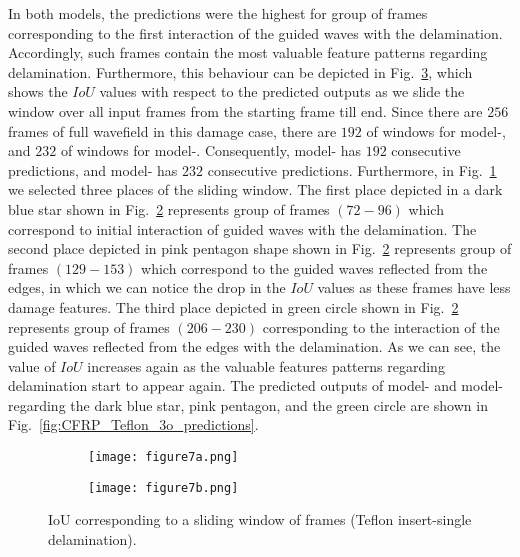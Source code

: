 
In both models, the predictions were the highest for group of frames corresponding to the first interaction of the guided waves with the delamination.
Accordingly, such frames contain the most valuable feature patterns regarding delamination. 
Furthermore, this behaviour can be depicted in Fig.~\ref{fig:CFRP_Teflon_3o_IoU_centre_window}, which shows the \(IoU\) values with respect to the predicted outputs as we slide the window over all input frames from the starting frame till end.
Since there are \(256\) frames of full wavefield in this damage case, there are \(192\) of windows for model-, and \(232\) of windows for model-.
Consequently, model- has \(192\) consecutive predictions, and model- has \(232\) consecutive predictions.
Furthermore, in Fig.~\ref{fig:CFRP_Teflon_3o_IoU_} we selected three places of the sliding window. 
The first place depicted in a dark blue star shown in Fig.~\ref{fig:CFRP_teflon_3o_shapes_} represents group of frames \((72-96)\) which correspond to initial interaction of guided waves with the delamination.
The second place depicted in pink pentagon shape shown in Fig.~\ref{fig:CFRP_teflon_3o_shapes_} represents group of frames \((129-153)\) which correspond to the guided waves reflected from the edges, in which we can notice the drop in the \(IoU\) values as these frames have less damage features.
The third place depicted in green circle shown in Fig.~\ref{fig:CFRP_teflon_3o_shapes_} represents group of frames \((206-230)\) corresponding to the interaction of the guided waves reflected from the edges with the delamination.
As we can see, the value of \(IoU\) increases again as the valuable features patterns regarding delamination start to appear again.
The predicted outputs of model- and model- regarding the dark blue star, pink pentagon, and the green circle are shown in Fig.~\ref{fig:CFRP_Teflon_3o_predictions}.
\begin{figure} [!h]
	\begin{subfigure}[b]{1\textwidth}
		\centering
		\texttt{[image: figure7a.png]}
		\caption{}
		\label{fig:CFRP_Teflon_3o_IoU_}
	\end{subfigure}
	\par\medskip
	\begin{subfigure}[b]{1\textwidth}
		\centering
		\texttt{[image: figure7b.png]}
		\caption{} 
		\label{fig:CFRP_teflon_3o_shapes_}
	\end{subfigure}
	\caption{IoU corresponding to a sliding window of frames (Teflon insert-single delamination).}
	\label{fig:CFRP_Teflon_3o_IoU_centre_window}
\end{figure} 
